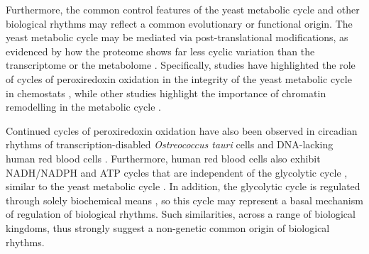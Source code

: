 Furthermore, the common control features of the yeast metabolic cycle and other biological rhythms may reflect a common evolutionary or functional origin.
The yeast metabolic cycle may be mediated via post-translational modifications, as evidenced by how the proteome shows far less cyclic variation than the transcriptome \parencite{felthamTranscriptionalChangesAre2020} or the metabolome \parencite{oneillEukaryoticCellBiology2020}.
Specifically, studies have highlighted the role of cycles of peroxiredoxin oxidation in the integrity of the yeast metabolic cycle in chemostats \parencite{caustonMetabolicCyclesYeast2015,amponsahPeroxiredoxinsCoupleMetabolism2021}, while other studies highlight the importance of chromatin remodelling in the metabolic cycle \parencite{nocettiNucleosomeRepositioningUnderlies2016,gowansINO80ChromatinRemodeling2018}.

Continued cycles of peroxiredoxin oxidation have also been observed in circadian rhythms of transcription-disabled \textit{Ostreococcus tauri} cells \parencite{oneillCircadianRhythmsPersist2011} and DNA-lacking human red blood cells \parencite{oneillCircadianClocksHuman2011}.
Furthermore, human red blood cells also exhibit NADH/NADPH and ATP cycles that are independent of the glycolytic cycle \parencite{oneillCircadianClocksHuman2011}, similar to the yeast metabolic cycle \parencite{papagiannakisAutonomousMetabolicOscillations2017}.
In addition, the glycolytic cycle is regulated through solely biochemical means \parencite{ghoshOscillationsGlycolyticIntermediates1964,higginsChemicalMechanismOscillation1964}, so this cycle may represent a basal mechanism of regulation of biological rhythms.
Such similarities, across a range of biological kingdoms, thus strongly suggest a non-genetic common origin of biological rhythms.
